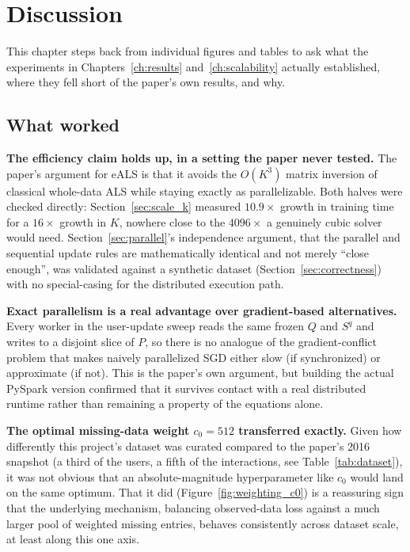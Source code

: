 \chapter{Discussion}
\label{ch:discussion}

This chapter steps back from individual figures and tables to ask what the
experiments in Chapters~\ref{ch:results} and~\ref{ch:scalability} actually
established, where they fell short of the paper's own results, and why.

\section{What worked}

\textbf{The efficiency claim holds up, in a setting the paper never
tested.} The paper's argument for eALS is that it avoids the $O(K^3)$
matrix inversion of classical whole-data ALS while staying exactly as
parallelizable. Both halves were checked directly: Section~\ref{sec:scale_k}
measured $10.9\times$ growth in training time for a $16\times$ growth in
$K$, nowhere close to the $4096\times$ a genuinely cubic solver would need.
Section~\ref{sec:parallel}'s independence argument, that the parallel and
sequential update rules are mathematically identical and not merely
``close enough'', was validated against a synthetic dataset
(Section~\ref{sec:correctness}) with no special-casing for the distributed
execution path.

\medskip
\textbf{Exact parallelism is a real advantage over gradient-based
alternatives.} Every worker in the user-update sweep reads the same frozen
$Q$ and $S^q$ and writes to a disjoint slice of $P$, so there is no
analogue of the gradient-conflict problem that makes naively parallelized
SGD either slow (if synchronized) or approximate (if not). This is the
paper's own argument, but building the actual PySpark version confirmed
that it survives contact with a real distributed runtime rather than
remaining a property of the equations alone.

\medskip
\textbf{The optimal missing-data weight $c_0=512$ transferred exactly.}
Given how differently this project's dataset was curated compared to the
paper's 2016 snapshot (a third of the users, a fifth of the interactions,
see Table~\ref{tab:dataset}), it was not obvious that an absolute-magnitude
hyperparameter like $c_0$ would land on the same optimum. That it did
(Figure~\ref{fig:weighting_c0}) is a reassuring sign that the underlying
mechanism, balancing observed-data loss against a much larger pool of
weighted missing entries, behaves consistently across dataset scale, at
least along this one axis.

